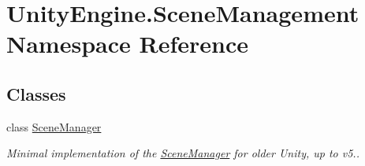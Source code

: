 \hypertarget{namespace_unity_engine_1_1_scene_management}{}\section{Unity\+Engine.\+Scene\+Management Namespace Reference}
\label{namespace_unity_engine_1_1_scene_management}
\subsection*{Classes}
\begin{DoxyCompactItemize}
\item 
class \hyperlink{class_unity_engine_1_1_scene_management_1_1_scene_manager}{Scene\+Manager}
\begin{DoxyCompactList}\small\item\em Minimal implementation of the \hyperlink{class_unity_engine_1_1_scene_management_1_1_scene_manager}{Scene\+Manager} for older Unity, up to v5..\end{DoxyCompactList}\end{DoxyCompactItemize}
